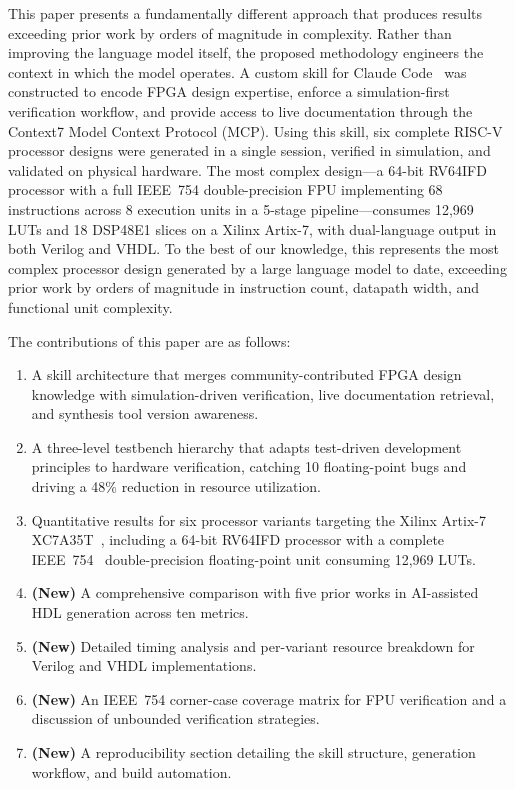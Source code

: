 \documentclass[journal]{IEEEtran}
\begin{document}
This paper presents a fundamentally different approach that produces
results exceeding prior work by orders of magnitude in complexity.
Rather than improving the language model itself, the proposed methodology
engineers the context in which the model operates.  A custom skill for
Claude Code~\cite{anthropic2026claude} was constructed to encode FPGA
design expertise, enforce a simulation-first verification workflow, and
provide access to live documentation through the Context7 Model Context
Protocol (MCP).  Using this skill, six complete RISC-V~\cite{waterman2019riscv}
processor designs were generated in a single session, verified in
simulation, and validated on physical hardware.  The most complex
design---a 64-bit RV64IFD processor with a full IEEE~754
double-precision FPU implementing 68 instructions across 8 execution
units in a 5-stage pipeline---consumes 12,969 LUTs and 18 DSP48E1 slices
on a Xilinx Artix-7, with dual-language output in both Verilog and VHDL.
To the best of our knowledge, this represents the most complex processor
design generated by a large language model to date, exceeding prior work
by orders of magnitude in instruction count, datapath width, and
functional unit complexity.

The contributions of this paper are as follows:
\begin{enumerate}[leftmargin=*]
\item A skill architecture that merges community-contributed FPGA design
      knowledge with simulation-driven verification, live documentation
      retrieval, and synthesis tool version awareness.
\item A three-level testbench hierarchy that adapts test-driven
      development principles to hardware verification, catching 10
      floating-point bugs and driving a 48\% reduction in resource
      utilization.
\item Quantitative results for six processor variants targeting the
      Xilinx Artix-7 XC7A35T~\cite{xilinx2020ds180}, including a 64-bit
      RV64IFD processor with a complete IEEE~754~\cite{ieee754_2019}
      double-precision floating-point unit consuming 12,969 LUTs.
\item \textbf{(New)} A comprehensive comparison with five prior works in
      AI-assisted HDL generation across ten metrics.
\item \textbf{(New)} Detailed timing analysis and per-variant resource
      breakdown for Verilog and VHDL implementations.
\item \textbf{(New)} An IEEE~754 corner-case coverage matrix for FPU
      verification and a discussion of unbounded verification strategies.
\item \textbf{(New)} A reproducibility section detailing the skill
      structure, generation workflow, and build automation.
\end{enumerate}
\end{document}
